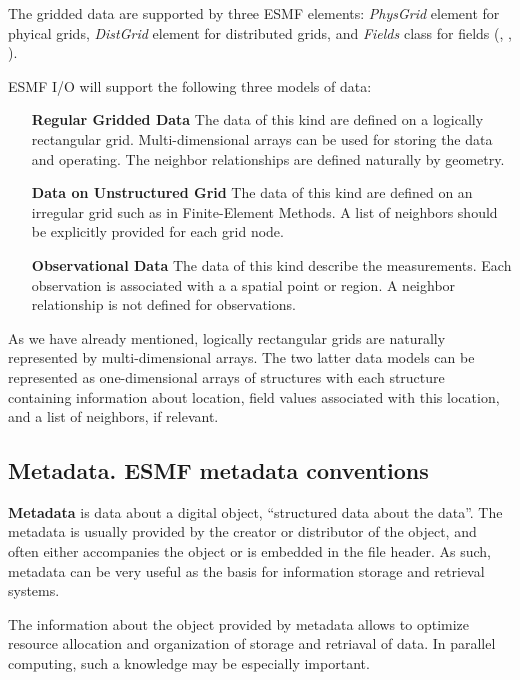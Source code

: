 The gridded data are supported by three ESMF elements: {\em PhysGrid} element 
for phyical grids, {\em DistGrid} element for distributed grids, and 
{\em Fields} class for fields (\cite{ESMF-PhysGrid-Req},
\cite{ESMF-DistGrid-Req}, \cite{ESMF-Field-Req}). 

ESMF I/O will support the following three models of data: 

\begin{itemize}
\item[\bf Regular Gridded Data] The data of this kind are defined on a
logically rectangular grid. Multi-dimensional arrays can be used for
storing the data and operating. The neighbor relationships are defined
naturally by geometry.

\item[\bf Data on Unstructured Grid] The data of this kind are defined on an 
irregular grid such as in Finite-Element Methods. A list of neighbors should 
be explicitly provided for each grid node. 

\item[\bf Observational Data] The data of this kind describe the 
measurements. Each observation is associated with a a spatial point or region.
A neighbor relationship is not defined for observations. 
\end{itemize}

As we have already mentioned, logically rectangular grids are naturally 
represented by multi-dimensional arrays. The two latter data models can be 
represented as one-dimensional arrays of structures with each structure 
containing information about location, field values associated with this 
location, and a list of neighbors, if relevant. 

\subsection{Metadata. ESMF metadata conventions}

{\bf Metadata} is data about a digital object, ``structured data about the 
data''. The metadata is usually provided by the creator or distributor of 
the object, and often either accompanies the object or is embedded in the 
file header. As such, metadata can be very useful as the basis for 
information storage and retrieval systems.

The information about the object provided by metadata allows to optimize  
resource allocation and organization of storage and retriaval of data. In 
parallel computing, such a knowledge may be especially important. 

